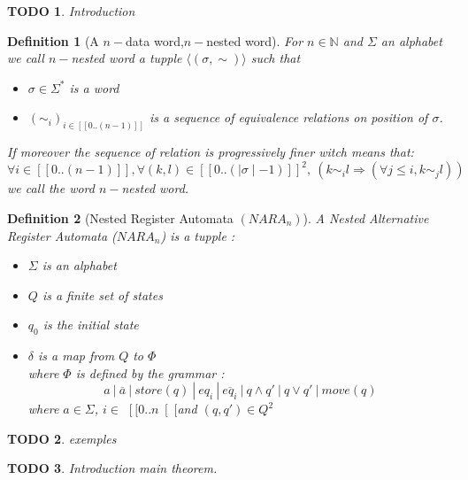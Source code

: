 \documentclass[a4paper,10pt]{report}
\title{}
\author{}
\newtheorem{df}{Definition}
\newtheorem{td}{TODO}
\newcommand{\seg}[1]{[\![#1]\!]}
\newcommand{\sego}[1]{\left [\![ #1 \right [\![}
\newcommand{\segw}[1]{\seg{0..(\mid #1\mid -1)}}
\newcommand{\ts}{$\sego{0 .. n}$}
\begin{document}
\maketitle

\begin{td}
  Introduction
\end{td}

\begin{df}[A $n-$data word,$n-$nested word]
 For $n \in \mathbb{N}$ and $\Sigma$ an alphabet we call $n-$nested word a tupple  
 $\langle (\sigma , \sim )  \rangle$
 such that 
  \begin{itemize}
   \item $\sigma \in \Sigma^* $ is a word
   \item $(\sim_i)_{i \in \seg{0 .. (n-1)} }$ is a sequence of equivalence relations on position of $\sigma$. 
  \end{itemize}
  If moreover the sequence of relation is progressively finer witch means that:  
  $$\forall i \in \seg{0 .. (n-1)}, \forall (k,l) \in \segw{\sigma}^2, \ (k \sim_i l \Rightarrow \left ( \forall j \leq i, k \sim_{j} l \right )) $$ 
   we call the word $n-$nested word.
\end{df}



\begin{df}[Nested Register Automata $(NARA_n)$]
  A Nested Alternative Register Automata ($NARA_n$) is a tupple : 
  \begin{itemize}
   \item $\Sigma$ is an alphabet
   \item $Q$ is a finite set of states
   \item $q_0$ is the initial state 
   \item $ \delta $ is a map from $Q $ to $\Phi $ \\ 
   where $\Phi$ is defined by the grammar : 
   $$ a \ | \  \overline{a} \ | \ store(q) \ | \ eq_i \ | \  \overline{eq_i} \ | \  q \wedge q' \ | \ q \vee q' \ | \ move(q)  $$
  where $a \in \Sigma$, $i \in $ \ts  and $(q,q') \in Q^2$
  \end{itemize}

\end{df}
\begin{td}
  exemples
\end{td}

\begin{td}
  Introduction main theorem.
\end{td}
\end{document}
